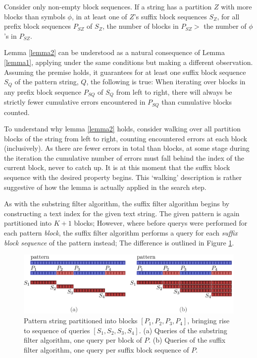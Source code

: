 \begin{lemma}
\label{lemma2}
Consider only non-empty \glspl{block sequence}. If a string has a partition $Z$ with more blocks than symbols $\phi{}$, in at least one of $Z$'s \glspl{suffix block sequence} $S_Z$, for all \glspl{prefix block sequence} $P_{SZ}$ of $S_Z$, the number of blocks in $P_{SZ} >$ the number of $\phi{}$'s in $P_{SZ}$.
\end{lemma}

Lemma \ref{lemma2} can be understood as a natural consequence of Lemma \ref{lemma1}, applying under the same conditions but making a different observation. Assuming the premise holds, it guarantees for at least one suffix block sequence $S_Q$ of the pattern string, $Q$, the following is true:
When iterating over blocks in any prefix block sequence $P_{SQ}$ of $S_Q$ from left to right, there will always be strictly fewer cumulative errors encountered in $P_{SQ}$ than cumulative blocks counted.
 
To understand why lemma \ref{lemma2} holds, consider walking over all partition blocks of the string from left to right, counting encountered \glspl{error} at each block (inclusively). As there are fewer errors in total than blocks, at some stage during the iteration the cumulative number of errors must fall behind the index of the current block, never to catch up. It is at this moment that the suffix block sequence with the desired property begins. This `walking' description is rather suggestive of how the lemma is actually applied in the \gls{search step}.

As with the substring filter algorithm, the suffix filter algorithm begins by constructing a \gls{text index} for the given text string. The given pattern is again partitioned into $K+1$ blocks; However, where before \glspl{query} were performed for each pattern \textit{block}, the suffix filter algorithm performs a query for each \textit{suffix block sequence} of the pattern instead; The difference is outlined in Figure \ref{fig:substring_vs_suffix}.

\begin{figure}[!htb]
\centering
\includegraphics[width=1.0\textwidth]{images/substring_suffix.png}
\caption[Pattern string blocks vs. suffix block sequences for substring and suffix filter algorithms.]{Pattern string partitioned into blocks $[P_1, P_2, P_3, P_4]$, bringing rise to sequence of queries $[S_1, S_2, S_3, S_4]$. (a) Queries of the substring filter algorithm, one query per block of $P$. (b) Queries of the suffix filter algorithm, one query per suffix block sequence of $P$.}
\label{fig:substring_vs_suffix}
\end{figure}

